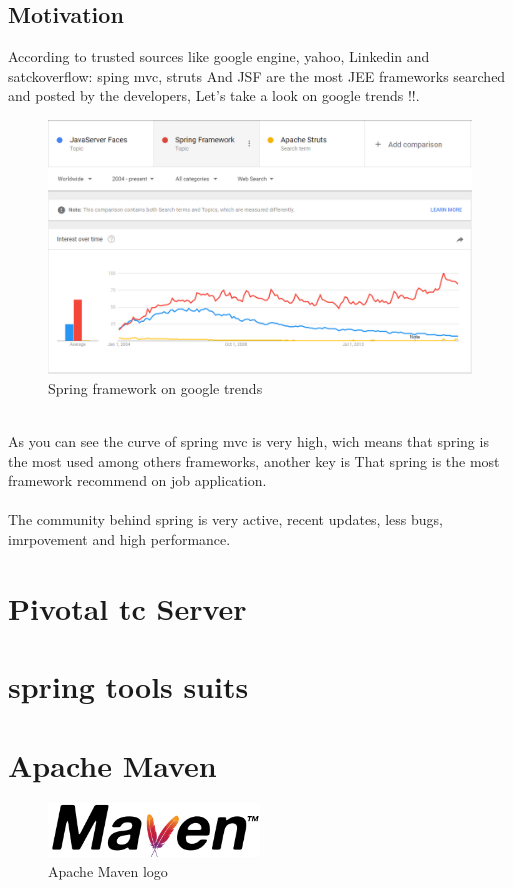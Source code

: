 \documentclass[12pt]{article}
\begin{document}
\subsection{Motivation}
According to trusted sources like google engine, yahoo, Linkedin and satckoverflow: sping mvc, struts And JSF are the most JEE frameworks searched and posted by the developers, Let's take a look on google trends !!.\\
\begin{figure}[h]
	\centering
	\includegraphics[width=1.0\textwidth]{SpringMVC_statics_google_trends.png}
	\caption{Spring framework on google trends}
\end{figure}
\\
As you can see the curve of spring mvc is very high, wich means that spring is the most used among others frameworks, another key is That spring is the most framework recommend on job application.
\\
\\
The community behind spring is very active, recent updates, less bugs, imrpovement and high performance.
\section{Pivotal tc Server}
\section{spring tools suits}
\section{Apache Maven}
\begin{figure}[h]
	\centering
	\includegraphics[width=0.5\textwidth]{Maven_logo.png}
	\caption{Apache Maven logo}
\end{figure}
\end{document}
